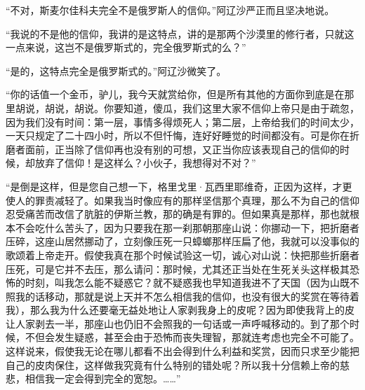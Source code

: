 \par “不对，斯麦尔佳科夫完全不是俄罗斯人的信仰。”阿辽沙严正而且坚决地说。
\par “我说的不是他的信仰，我讲的是这特点，讲的是那两个沙漠里的修行者，只就这一点来说，这岂不是俄罗斯式的，完全俄罗斯式的么？”
\par “是的，这特点完全是俄罗斯式的。”阿辽沙微笑了。
\par “你的话值一个金币，驴儿，我今天就赏给你，但是所有其他的方面你到底是在那里胡说，胡说，胡说。你要知道，傻瓜，我们这里大家不信仰上帝只是由于疏忽，因为我们没有时间：第一层，事情多得烦死人；第二层，上帝给我们的时间太少，一天只规定了二十四小时，所以不但忏悔，连好好睡觉的时间都没有。可是你在折磨者面前，正当除了信仰再也没有别的可想，又正当你应该表现自己的信仰的时候，却放弃了信仰！是这样么？小伙子，我想得对不对？”
\par “是倒是这样，但是您自己想一下，格里戈里·瓦西里耶维奇，正因为这样，才更使人的罪责减轻了。如果我当时像应有的那样坚信那个真理，那么不为自己的信仰忍受痛苦而改信了肮脏的伊斯兰教，那的确是有罪的。但如果真是那样，那也就根本不会吃什么苦头了，因为只要我在那一刹那朝那座山说：你挪动一下，把折磨者压碎，这座山居然挪动了，立刻像压死一只蟑螂那样压扁了他，我就可以没事似的歌颂着上帝走开。假使我真在那个时候试验这一切，诚心对山说：快把那些折磨者压死，可是它并不去压，那么请问：那时候，尤其还正当处在生死关头这样极其恐怖的时刻，叫我怎么能不疑惑它？就不疑惑我也早知道我进不了天国（因为山既不照我的话移动，那就是说上天并不怎么相信我的信仰，也没有很大的奖赏在等待着我），那么我为什么还要毫无益处地让人家剥我身上的皮呢？因为即使我背上的皮让人家剥去一半，那座山也仍旧不会照我的一句话或一声呼喊移动的。到了那个时候，不但会发生疑惑，甚至会由于恐怖而丧失理智，那就连考虑也完全不可能了。这样说来，假使我无论在哪儿都看不出会得到什么利益和奖赏，因而只求至少能把自己的皮肉保住，这样做我究竟有什么特别的错处呢？所以我十分信赖上帝的慈悲，相信我一定会得到完全的宽恕。……”
